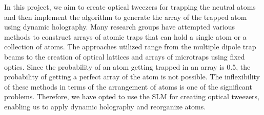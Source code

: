 In this project, we aim to create optical tweezers for trapping the neutral atoms and then implement the algorithm to generate the array of the trapped atom using dynamic holography. Many research groups have attempted various methods to construct arrays of atomic traps that can hold a single atom or a collection of atoms. The approaches utilized range from the multiple dipole trap beams to the creation of optical lattices and arrays of microtraps using fixed optics. Since the probability of an atom getting trapped in an array is 0.5, the probability of getting a perfect array of the atom is not possible. The inflexibility of these methods in terms of the arrangement of atoms is one of the significant problems. Therefore, we have opted to use the SLM for creating optical tweezers, enabling us to apply dynamic holography and reorganize atoms.





